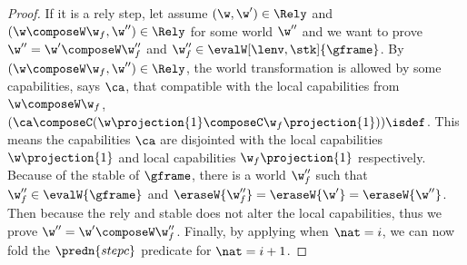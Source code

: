 \begin{proof}
If it is a rely step, let assume \( (\w, \w') \in \Rely \) and \( (\w \composeW \w_f, \w'') \in \Rely \) for some world \( \w'' \) and we want to prove \( \w''  = \w' \composeW \w_f'' \) and \( \w_f'' \in \evalW[\lenv, \stk]{\gframe} \).
By \( (\w \composeW \w_f, \w'') \in \Rely \), the world transformation is allowed by some capabilities, says \( \ca\), that compatible with the local capabilities from \( \w \composeW \w_f \), \ie \( (\ca \composeC (\w\projection{1} \composeC \w_f\projection{1}) )\isdef \).
This means the capabilities \( \ca \) are disjointed with the local capabilities \( \w\projection{1} \) and local capabilities \( \w_f\projection{1}\) respectively.
Because of the stable of \( \gframe \), there is a world \( \w_f'' \) such that \( \w_f'' \in \evalW{\gframe}\) and \( \eraseW{\w_f''} = \eraseW{\w'} = \eraseW{\w''}\).
Then because the rely and stable does not alter the local capabilities, thus we prove \( \w'' = \w' \composeW \w_f'' \).
Finally, by applying \ih when \( \nat = i \), we can now fold the \( \predn{stepc} \) predicate for \( \nat = i + 1 \).

\end{proof}


